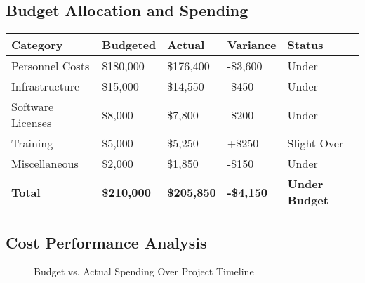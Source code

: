 \documentclass[12pt,a4paper]{article}
\begin{document}
\subsection{Budget Allocation and Spending}

\begin{longtable}{|p{3cm}|p{2.5cm}|p{2.5cm}|p{2cm}|p{2cm}|}
\hline
\textbf{Category} & \textbf{Budgeted} & \textbf{Actual} & \textbf{Variance} & \textbf{Status} \\
\hline
Personnel Costs & \$180,000 & \$176,400 & -\$3,600 & \cellcolor{completedgreen}Under \\
\hline
Infrastructure & \$15,000 & \$14,550 & -\$450 & \cellcolor{completedgreen}Under \\
\hline
Software Licenses & \$8,000 & \$7,800 & -\$200 & \cellcolor{completedgreen}Under \\
\hline
Training & \$5,000 & \$5,250 & +\$250 & \cellcolor{completedgreen}Slight Over \\
\hline
Miscellaneous & \$2,000 & \$1,850 & -\$150 & \cellcolor{completedgreen}Under \\
\hline
\textbf{Total} & \textbf{\$210,000} & \textbf{\$205,850} & \textbf{-\$4,150} & \textbf{\cellcolor{completedgreen}Under Budget} \\
\hline
\end{longtable}

\subsection{Cost Performance Analysis}

\begin{figure}[H]
\centering
{}
\caption{Budget vs. Actual Spending Over Project Timeline}
\label{fig:budget-performance}
\end{figure}
\end{document}
